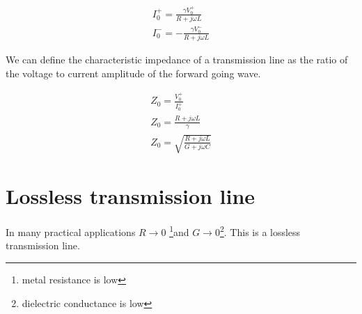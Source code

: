 \documentclass{ximera}
\begin{document}
\begin{eqnarray}
I_0^+=\frac{\gamma V_0^+}{R+ j \omega L} \nonumber  \\
I_0^-= - \frac{\gamma V_0^-}{R+ j \omega L} \nonumber
\end{eqnarray}

We can define the characteristic impedance of a transmission line as
the ratio of the voltage to current amplitude of the forward going
wave.


\begin{eqnarray}
Z_0=\frac{V_0^+}{ I_0^+} \nonumber   \\ \nonumber
Z_0=\frac{R+j\omega L}{\gamma} \nonumber   \\ \nonumber
Z_0=\sqrt{\frac{R+j\omega L}{G+ j\omega C}}
\end{eqnarray}


\section{Lossless transmission line}


In many practical applications $R\to 0$ \footnote{metal resistance is
low}and $G \to 0$\footnote{dielectric conductance is low}. This is a
lossless transmission line.
\end{document}
